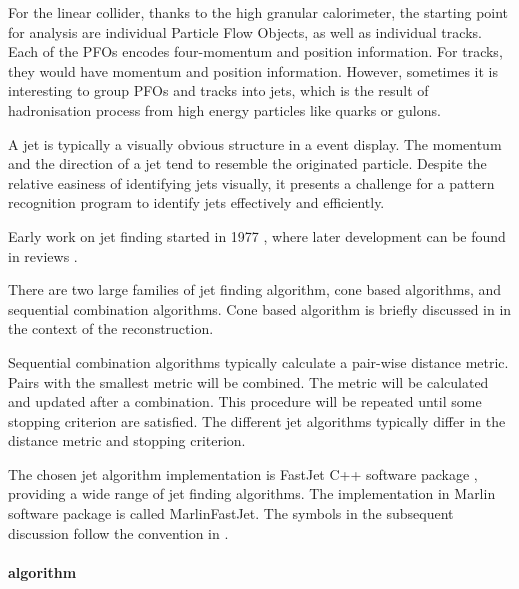 For the linear collider, thanks to the high granular calorimeter, the starting point for analysis are individual Particle Flow Objects, as well as individual tracks. Each of the PFOs encodes four-momentum and position information. For tracks, they would have momentum and position information. However, sometimes it is interesting to group PFOs and tracks into jets, which is the result of hadronisation process from high energy particles like quarks or gulons.

A jet is typically a visually obvious structure in a event display. The momentum and the direction of a jet tend to resemble the originated particle. Despite the relative easiness of identifying jets visually, it presents a challenge for a pattern recognition program to identify jets effectively and efficiently.

Early work on jet finding started in 1977 \cite{Sterman:1977wj}, where later development can be found in reviews \cite{Moretti:1998qx,Salam:2009jx,Ali:2010tw}.

There are two large families of jet finding algorithm, cone based algorithms, and sequential combination algorithms. Cone based algorithm is briefly discussed in  in the context of the \pandora reconstruction.

Sequential combination algorithms typically calculate a pair-wise distance metric. Pairs with the smallest metric will be combined. The metric will be calculated and updated after a combination. This procedure will be repeated until some stopping criterion are satisfied. The different jet algorithms typically differ in the distance metric and stopping criterion.

The chosen jet algorithm implementation is FastJet C++ software package \cite{Cacciari:2011ma,Cacciari:2005hq}, providing a wide range of jet finding algorithms. The implementation in Marlin software package is called MarlinFastJet. The symbols in the subsequent discussion follow the convention in \cite{Cacciari:2011ma}.

\paragraph{\kt algorithm}

